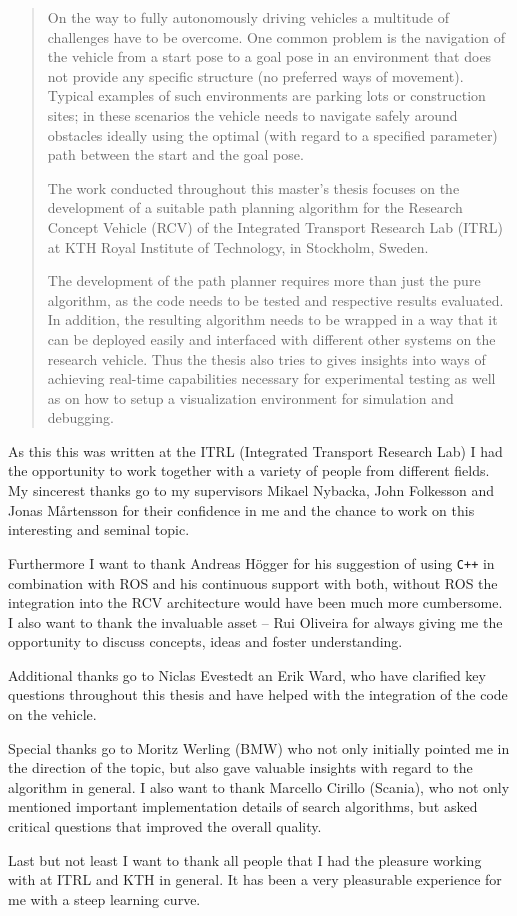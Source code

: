 \begin{abstract}
On the way to fully autonomously driving vehicles a multitude of challenges have to be overcome. One common problem is the navigation of the vehicle from a start pose to a goal pose in an environment that does not provide any specific structure (no preferred ways of movement). Typical examples of such environments are parking lots or construction sites; in these scenarios the vehicle needs to navigate safely around obstacles ideally using the optimal (with regard to a specified parameter) path between the start and the goal pose.

The work conducted throughout this master's thesis focuses on the development of a suitable path planning algorithm for the Research Concept Vehicle (RCV) of the Integrated Transport Research Lab (ITRL) at KTH Royal Institute of Technology, in Stockholm, Sweden.

The development of the path planner requires more than just the pure algorithm, as the code needs to be tested and respective results evaluated. In addition, the resulting algorithm needs to be wrapped in a way that it can be deployed easily and interfaced with different other systems on the research vehicle. Thus the thesis also tries to gives insights into ways of achieving real-time capabilities necessary for experimental testing as well as on how to setup a visualization environment for simulation and debugging.
\end{abstract}

\begin{acknowledgements}
As this this was written at the ITRL (Integrated Transport Research Lab) I had the opportunity to work together with a variety of people from different fields. My sincerest thanks go to my supervisors Mikael Nybacka, John Folkesson and Jonas Mårtensson for their confidence in me and the chance to work on this interesting and seminal topic.

Furthermore I want to thank Andreas Högger for his suggestion of using \texttt{C++} in combination with ROS and his continuous support with both, without ROS the integration into the RCV architecture would have been much more cumbersome. I also want to thank the invaluable asset -- Rui Oliveira for always giving me the opportunity to discuss concepts, ideas and foster understanding.

Additional thanks go to Niclas Evestedt an Erik Ward, who have clarified key questions throughout this thesis and have helped with the integration of the code on the vehicle.

Special thanks go to Moritz Werling (BMW) who not only initially pointed me in the direction of the topic, but also gave valuable insights with regard to the algorithm in general. I also want to thank Marcello Cirillo (Scania), who not only mentioned important implementation details of search algorithms, but asked critical questions that improved the overall quality.

Last but not least I want to thank all people that I had the pleasure working with at ITRL and KTH in general. It has been a very pleasurable experience for me with a steep learning curve.
\end{acknowledgements}